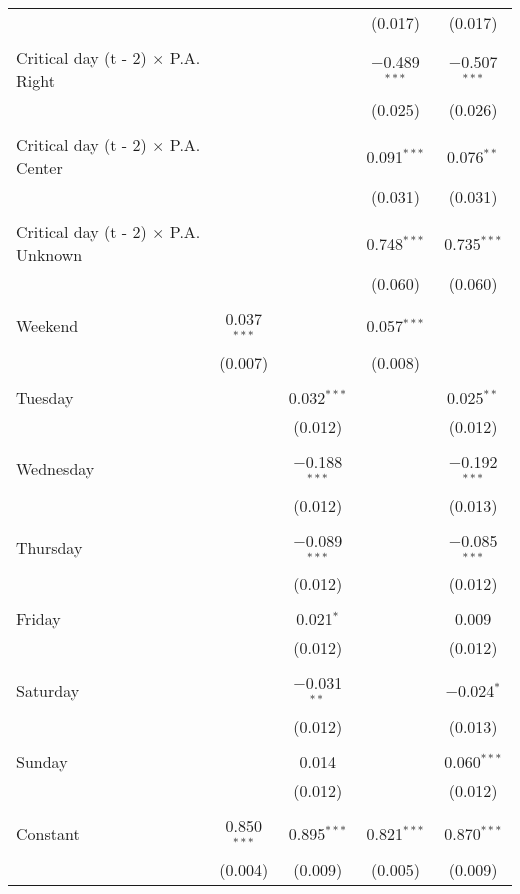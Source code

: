 \documentclass[
]{article}
\begin{document}
\begin{table}[!htbp]
{\begin{tabular}{@{\extracolsep{5pt}}lcccc}
  &  &  & (0.017) & (0.017) \\ 
  & & & & \\ 
 Critical day (t - 2) $\times$ P.A. Right &  &  & $-$0.489$^{***}$ & $-$0.507$^{***}$ \\ 
  &  &  & (0.025) & (0.026) \\ 
  & & & & \\ 
 Critical day (t - 2) $\times$ P.A. Center &  &  & 0.091$^{***}$ & 0.076$^{**}$ \\ 
  &  &  & (0.031) & (0.031) \\ 
  & & & & \\ 
 Critical day (t - 2) $\times$ P.A. Unknown &  &  & 0.748$^{***}$ & 0.735$^{***}$ \\ 
  &  &  & (0.060) & (0.060) \\ 
  & & & & \\ 
 Weekend & 0.037$^{***}$ &  & 0.057$^{***}$ &  \\ 
  & (0.007) &  & (0.008) &  \\ 
  & & & & \\ 
 Tuesday &  & 0.032$^{***}$ &  & 0.025$^{**}$ \\ 
  &  & (0.012) &  & (0.012) \\ 
  & & & & \\ 
 Wednesday &  & $-$0.188$^{***}$ &  & $-$0.192$^{***}$ \\ 
  &  & (0.012) &  & (0.013) \\ 
  & & & & \\ 
 Thursday &  & $-$0.089$^{***}$ &  & $-$0.085$^{***}$ \\ 
  &  & (0.012) &  & (0.012) \\ 
  & & & & \\ 
 Friday &  & 0.021$^{*}$ &  & 0.009 \\ 
  &  & (0.012) &  & (0.012) \\ 
  & & & & \\ 
 Saturday &  & $-$0.031$^{**}$ &  & $-$0.024$^{*}$ \\ 
  &  & (0.012) &  & (0.013) \\ 
  & & & & \\ 
 Sunday &  & 0.014 &  & 0.060$^{***}$ \\ 
  &  & (0.012) &  & (0.012) \\ 
  & & & & \\ 
 Constant & 0.850$^{***}$ & 0.895$^{***}$ & 0.821$^{***}$ & 0.870$^{***}$ \\ 
  & (0.004) & (0.009) & (0.005) & (0.009) \\ 

\end{tabular}}
\end{table}
\end{document}
